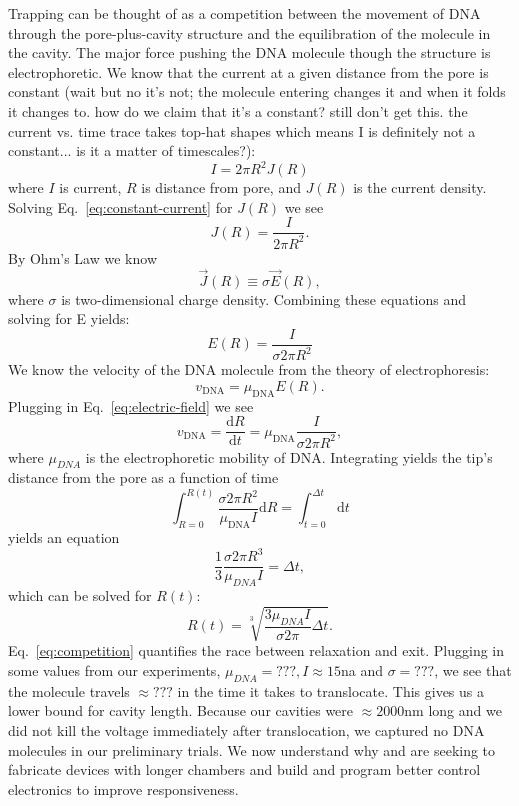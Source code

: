 \documentclass[aps,prl,preprint,groupedaddress]{revtex4}
\begin{document}
Trapping can be thought of as a competition between the movement of DNA through the pore-plus-cavity structure and the equilibration of the molecule in the cavity. The major force pushing the DNA molecule though the structure is electrophoretic. We know that the current at a given distance from the pore is constant (wait but no it's not; the molecule entering changes it and when it folds it changes to. how do we claim that it's a constant? still don't get this. the current vs. time trace takes top-hat shapes which means I is definitely not a constant... is it a matter of timescales?): 
\begin{equation} I = 2 \pi R^2 J(R) \label{eq:constant-current}\end{equation} 
where \(I\) is current, \(R\) is distance from pore, and \(J(R)\) is the current density. Solving Eq.~\ref{eq:constant-current} for \(J(R)\) we see 
\[J(R) = \frac{I}{2 \pi R^2}.\] 
By Ohm's Law we know 
\[\overrightarrow{J}(R) \equiv \sigma \overrightarrow{E}(R),\]
where \(\sigma\) is two-dimensional charge density.
Combining these equations and solving for E yields:
\begin{equation} E(R) = \frac{I}{\sigma 2 \pi R^2} \label{eq:electric-field} \end{equation} 
We know the velocity of the DNA molecule from the theory of electrophoresis: 
\begin{equation} v_{\mathrm{DNA}} = \mu_{\mathrm{DNA}} E(R) \label{eq:velocity} .\end{equation} 
Plugging in Eq.~\ref{eq:electric-field} we see 
\[v_{\mathrm{DNA}} = \frac{\mathrm{d}R}{\mathrm{d}t} = \mu_{\mathrm{DNA}} \frac{I}{\sigma 2 \pi R^2},\]
where \(\mu_{DNA}\) is the electrophoretic mobility of DNA.
Integrating yields the tip's distance from the pore as a function of time
\[\int_{R=0}^{R(t)} \frac{\sigma 2 \pi R^2}{\mu_{\mathrm{DNA}} I} \mathrm{d}R = \int_{t=0}^{\Delta t} \mathrm{d}t \]
yields an equation
\[\frac{1}{3} \frac{\sigma 2 \pi R^3}{\mu_{DNA} I} = \Delta t,\]
which can be solved for \(R(t)\):
\begin{equation} R(t) = \sqrt[3]{\frac{3 \mu_{DNA} I}{\sigma 2 \pi}\Delta t} .\label{eq:competition}\end{equation}
Eq.~\ref{eq:competition} quantifies the race between relaxation and exit. Plugging in some values from our experiments, \(\mu_{DNA} = ???, I \approx 15\)na and \(\sigma = ???\), we see that the molecule travels \(\approx ???\) in the time it takes to translocate. This gives us a lower bound for cavity length. Because our cavities were \(\approx 2000\)nm long and we did not kill the voltage immediately after translocation, we captured no DNA molecules in our preliminary trials. We now understand why and are seeking to fabricate devices with longer chambers and build and program better control electronics to improve responsiveness. 
\end{document}
